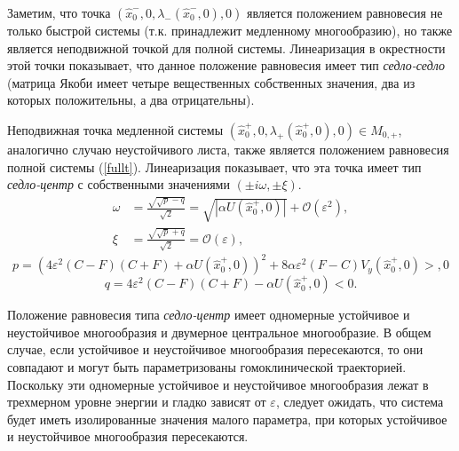Заметим, что точка $(\hat x^{-}_0, 0, \lambda_{-}(\hat x^{-}_0, 0), 0)$ является положением равновесия не только быстрой системы (т.к. принадлежит медленному многообразию), но также является неподвижной точкой для полной системы. Линеаризация в окрестности этой точки показывает, что данное положение равновесия имеет тип \textit{седло-седло} (матрица Якоби имеет четыре вещественных собственных значения, два из которых положительны, а два отрицательны).


Неподвижная точка медленной системы $(\hat x^{+}_0, 0, \lambda_{+}(\hat x^{+}_0, 0), 0) \in M_{0,+}$, аналогично случаю неустойчивого листа, также является положением равновесия полной системы (\ref{fullt}). Линеаризация показывает, что эта точка имеет тип \textit{седло-центр} с собственными значениями $(\pm i \omega, \pm \xi)$.
    \begin{align*}
    \omega &= \frac{\sqrt{\sqrt p - q}}{\sqrt 2} = \sqrt{|\alpha U(\hat x_0^+,0)|} + \mathcal{O}(\varepsilon^2), \\
    \xi &=    \frac{\sqrt{\sqrt p + q}}{\sqrt 2} = \mathcal{O}(\varepsilon),
    \label{eigenval}
    \end{align*}
    $$p = (4 \varepsilon^2(C-F)(C+F) + \alpha U(\hat x_0^+,0))^2 + 8 \alpha \varepsilon^2 (F-C) V_y(\hat x_0^+,0) > ,0$$
    $$q = 4 \varepsilon^2 (C-F)(C+F) - \alpha U(\hat x_0^+,0) < 0.$$    


    Положение равновесия типа \textit{седло-центр} имеет одномерные устойчивое и неустойчивое многообразия и двумерное центральное многообразие. В общем случае, если устойчивое и неустойчивое многообразия пересекаются, то они совпадают и могут быть параметризованы гомоклинической траекторией. Поскольку эти одномерные устойчивое и неустойчивое многообразия лежат в трехмерном уровне энергии и гладко зависят от $\varepsilon$, следует ожидать, что система будет иметь изолированные значения малого параметра, при которых  устойчивое и неустойчивое многообразия пересекаются.
